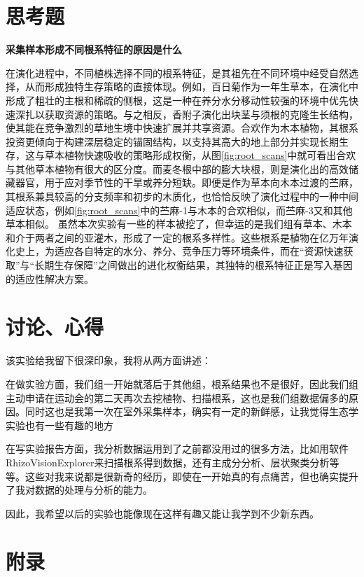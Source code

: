 \documentclass[10.5pt]{config}
\begin{document}
\section{思考题}
\textbf{采集样本形成不同根系特征的原因是什么}

在演化进程中，不同植株选择不同的根系特征，是其祖先在不同环境中经受自然选择，从而形成独特生存策略的直接体现。例如，百日菊作为一年生草本，在演化中形成了粗壮的主根和稀疏的侧根，这是一种在养分水分移动性较强的环境中优先快速深扎以获取资源的策略。与之相反，香附子演化出块茎与须根的克隆生长结构，使其能在竞争激烈的草地生境中快速扩展并共享资源。合欢作为木本植物，其根系投资更倾向于构建深层稳定的锚固结构，以支持其高大的地上部分并实现长期生存，这与草本植物快速吸收的策略形成权衡，从图\ref{fig:root_scans}中就可看出合欢与其他草本植物有很大的区分度。而麦冬根中部的膨大块根，则是演化出的高效储藏器官，用于应对季节性的干旱或养分短缺。即便是作为草本向木本过渡的苎麻，其根系兼具较高的分支频率和初步的木质化，也恰恰反映了演化过程中的一种中间适应状态，例如\ref{fig:root_scans}中的苎麻-1与木本的合欢相似，而苎麻-3又和其他草本相似。
虽然本次实验有一些的样本被挖了，但幸运的是我们组有草本、木本和介于两者之间的亚灌木，形成了一定的根系多样性。这些根系是植物在亿万年演化史上，为适应各自特定的水分、养分、竞争压力等环境条件，而在“资源快速获取”与“长期生存保障”之间做出的进化权衡结果，其独特的根系特征正是写入基因的适应性解决方案。

\section{讨论、心得}

该实验给我留下很深印象，我将从两方面讲述：

在做实验方面，我们组一开始就落后于其他组，根系结果也不是很好，因此我们组主动申请在运动会的第二天再次去挖植物、扫描根系，这也是我们组数据偏多的原因。同时这也是我第一次在室外采集样本，确实有一定的新鲜感，让我觉得生态学实验也有一些有趣的地方

在写实验报告方面，我分析数据运用到了之前都没用过的很多方法，比如用软件RhizoVisionExplorer来扫描根系得到数据，还有主成分分析、层状聚类分析等等。这些对我来说都是很新奇的经历，即使在一开始真的有点痛苦，但也确实提升了我对数据的处理与分析的能力。

因此，我希望以后的实验也能像现在这样有趣又能让我学到不少新东西。

\section{附录}
\end{document}
